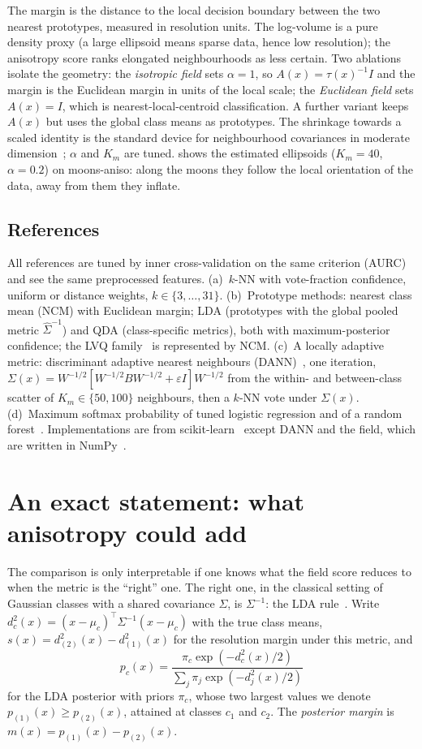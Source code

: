 \documentclass[10pt,a4paper]{article}
\theoremstyle{plain}
\theoremstyle{definition}
\theoremstyle{remark}
\newcommand{\Sig}{\Sigma}
\newcommand{\dd}{d^2}
\begin{document}
The margin is the distance to the local decision boundary between the two nearest prototypes, measured in resolution units. The log-volume is a pure density proxy (a large ellipsoid means sparse data, hence low resolution); the anisotropy score ranks elongated neighbourhoods as less certain. Two ablations isolate the geometry: the \emph{isotropic field} sets $\alpha=1$, so $A(x)=\tau(x)^{-1}I$ and the margin is the Euclidean margin in units of the local scale; the \emph{Euclidean field} sets $A(x)=I$, which is nearest-local-centroid classification. A further variant keeps $A(x)$ but uses the global class means as prototypes. The shrinkage towards a scaled identity is the standard device for neighbourhood covariances in moderate dimension~\citep{ledoit2004}; $\alpha$ and $K_m$ are tuned.  shows the estimated ellipsoids ($K_m=40$, $\alpha=0.2$) on moons-aniso: along the moons they follow the local orientation of the data, away from them they inflate.


\subsection{References}

All references are tuned by inner cross-validation on the same criterion (AURC) and see the same preprocessed features. (a)~$k$-NN with vote-fraction confidence, uniform or distance weights, $k\in\{3,\dots,31\}$. (b)~Prototype methods: nearest class mean (NCM) with Euclidean margin; LDA (prototypes with the global pooled metric $\hat\Sig^{-1}$) and QDA (class-specific metrics), both with maximum-posterior confidence; the LVQ family~\citep{kohonen1990,kohonen1995} is represented by NCM. (c)~A locally adaptive metric: discriminant adaptive nearest neighbours (DANN)~\citep{hastie1996}, one iteration, $\Sig(x)=W^{-1/2}[W^{-1/2}BW^{-1/2}+\varepsilon I]W^{-1/2}$ from the within- and between-class scatter of $K_m\in\{50,100\}$ neighbours, then a $k$-NN vote under $\Sig(x)$. (d)~Maximum softmax probability of tuned logistic regression and of a random forest~\citep{breiman2001}. Implementations are from scikit-learn~\citep{pedregosa2011} except DANN and the field, which are written in NumPy~\citep{harris2020}.

\section{An exact statement: what anisotropy could add}\label{sec:exact}

The comparison is only interpretable if one knows what the field score reduces to when the metric is the ``right'' one. The right one, in the classical setting of Gaussian classes with a shared covariance $\Sig$, is $\Sig^{-1}$: the LDA rule~\citep{fisher1936,hastie2009}. Write $\dd_c(x)=(x-\mu_c)^{\top}\Sig^{-1}(x-\mu_c)$ with the true class means, $s(x)=\dd_{(2)}(x)-\dd_{(1)}(x)$ for the resolution margin under this metric, and
\[
p_c(x)=\frac{\pi_c\exp(-\dd_c(x)/2)}{\sum_j \pi_j\exp(-\dd_j(x)/2)}
\]
for the LDA posterior with priors $\pi_c$, whose two largest values we denote $p_{(1)}(x)\ge p_{(2)}(x)$, attained at classes $c_1$ and $c_2$. The \emph{posterior margin} is $m(x)=p_{(1)}(x)-p_{(2)}(x)$.
\end{document}
